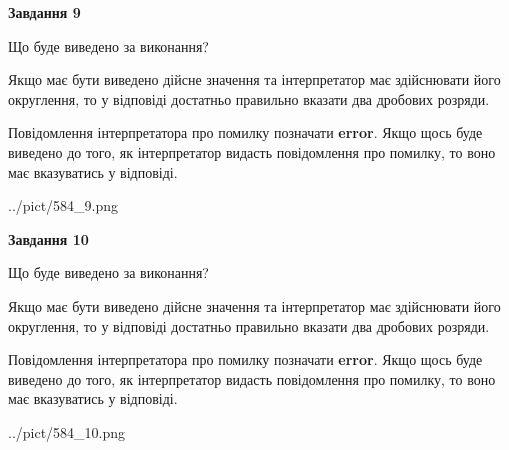 \documentclass[12pt, ukrainian]{article}
\begin{document}
{\begin {Large}
{\begin {center}\textbf{Завдання 9}\end {center}}\par
Що буде виведено за виконання? \par

Якщо має бути виведено дійсне значення та інтерпретатор має здійснювати його округлення, 
то у відповіді достатньо правильно вказати два дробових розряди.

Повідомлення інтерпретатора про помилку позначати \textbf{error}.
Якщо щось буде виведено до того, як інтерпретатор видасть повідомлення про помилку, 
то воно має вказуватись у відповіді. \par

\begin{center}
	{../pict/584_9.png}
\end{center}
\newpage

{\begin {center}\textbf{Завдання 10}\end {center}}\par
Що буде виведено за виконання? \par

Якщо має бути виведено дійсне значення та інтерпретатор має здійснювати його округлення, 
то у відповіді достатньо правильно вказати два дробових розряди.

Повідомлення інтерпретатора про помилку позначати \textbf{error}.
Якщо щось буде виведено до того, як інтерпретатор видасть повідомлення про помилку, 
то воно має вказуватись у відповіді. \par

\begin{center}
	{../pict/584_10.png}
\end{center}
\newpage

\end {Large}}
\end{document}

